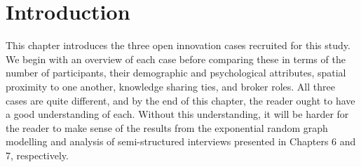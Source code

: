 \section{Introduction}

This chapter introduces the three open innovation cases recruited for this study. We begin with an overview of each case before comparing these in terms of the number of participants, their demographic and psychological attributes, spatial proximity to one another, knowledge sharing ties, and broker roles. All three cases are quite different, and by the end of this chapter, the reader ought to have a good understanding of each. Without this understanding, it will be harder for the reader to make sense of the results from the exponential random graph modelling and analysis of semi-structured interviews presented in Chapters 6 and 7, respectively. \medskip

\begin{table}
\centering
{}
\end{table}

